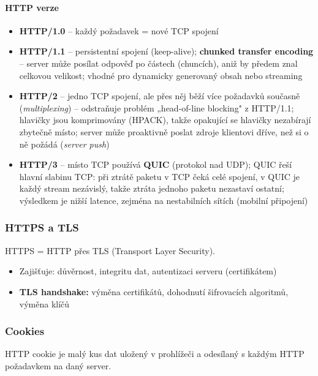 \paragraph{HTTP verze}
\begin{itemize}
  \item \textbf{HTTP/1.0} -- každý požadavek = nové TCP spojení
  \item \textbf{HTTP/1.1} -- persistentní spojení (keep-alive); \textbf{chunked transfer encoding} --
    server může posílat odpověď po částech (chuncích), aniž by předem znal celkovou velikost;
    vhodné pro dynamicky generovaný obsah nebo streaming
  \item \textbf{HTTP/2} -- jedno TCP spojení, ale přes něj běží více požadavků současně
    (\textit{multiplexing}) -- odstraňuje problém „head-of-line blocking" z HTTP/1.1;
    hlavičky jsou komprimovány (HPACK), takže opakující se hlavičky nezabírají zbytečně místo;
    server může proaktivně poslat zdroje klientovi dříve, než si o ně požádá (\textit{server push})
  \item \textbf{HTTP/3} -- místo TCP používá \textbf{QUIC} (protokol nad UDP); QUIC řeší
    hlavní slabinu TCP: při ztrátě paketu v TCP čeká celé spojení, v QUIC je každý stream
    nezávislý, takže ztráta jednoho paketu nezastaví ostatní; výsledkem je nižší latence,
    zejména na nestabilních sítích (mobilní připojení)
\end{itemize}

\subsubsection{HTTPS a TLS}

HTTPS = HTTP přes TLS (Transport Layer Security).
\begin{itemize}
  \item Zajišťuje: důvěrnost, integritu dat, autentizaci serveru (certifikátem)
  \item \textbf{TLS handshake:} výměna certifikátů, dohodnutí šifrovacích algoritmů, výměna klíčů
\end{itemize}

\subsubsection{Cookies}

HTTP cookie je malý kus dat uložený v prohlížeči a odesílaný s každým HTTP požadavkem na daný server.


